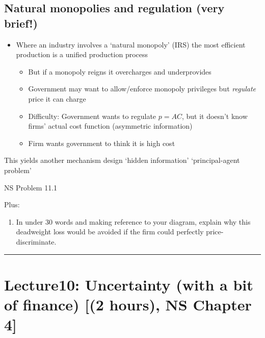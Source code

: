 \documentclass[]{article}
\providecommand{\tightlist}{%
  \setlength{\itemsep}{0pt}\setlength{\parskip}{0pt}}
\begin{document}
\hypertarget{natural-monopolies-and-regulation-very-brief}{%
\subsection{Natural monopolies and regulation (very
brief!)}\label{natural-monopolies-and-regulation-very-brief}}

\begin{itemize}
\tightlist
\item
  Where an industry involves a `natural monopoly' (IRS) the most
  efficient production is a unified production process

  \begin{itemize}
  \tightlist
  \item
    But if a monopoly reigns it overcharges and underprovides
  \item
    Government may want to allow/enforce monopoly privileges but
    \emph{regulate} price it can charge
  \item
    Difficulty: Government wants to regulate \(p=AC\), but it doesn't
    know firms' actual cost function (asymmetric information)
  \item
    Firm wants government to think it is high cost
  \end{itemize}
\end{itemize}

This yields another mechanism design `hidden information'
`principal-agent problem'

NS Problem 11.1

Plus:

\begin{enumerate}
\def\labelenumi{\alph{enumi}.}
\setcounter{enumi}{3}
\tightlist
\item
  In under 30 words and making reference to your diagram, explain why
  this deadweight loss would be avoided if the firm could perfectly
  price-discriminate.
\end{enumerate}

\begin{center}\rule{0.5\linewidth}{\linethickness}\end{center}

\hypertarget{lecture10-uncertainty-with-a-bit-of-finance-2-hours-ns-chapter-4}{%
\section{Lecture10: Uncertainty (with a bit of finance) {[}(2 hours), NS
Chapter
4{]}}\label{lecture10-uncertainty-with-a-bit-of-finance-2-hours-ns-chapter-4}}
\end{document}
